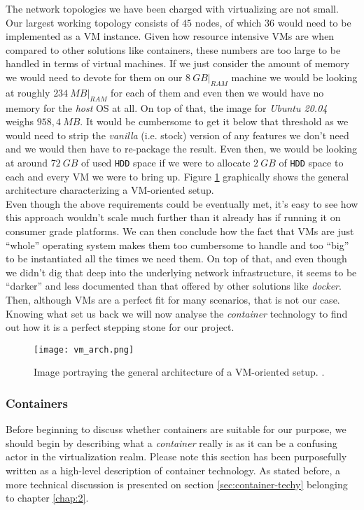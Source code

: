                 The network topologies we have been charged with virtualizing are not small. Our largest working topology consists of $45$ nodes, of which $36$ would need to be implemented as a VM instance. Given how resource intensive VMs are when compared to other solutions like containers, these numbers are too large to be handled in terms of virtual machines. If we just consider the amount of memory we would need to devote for them on our $8\ GB\rvert_{RAM}$ machine we would be looking at roughly $234\ MB\rvert_{RAM}$ for each of them and even then we would have no memory for the \textit{host} OS at all. On top of that, the image for \textit{Ubuntu 20.04} weighs $958,4\ MB$. It would be cumbersome to get it below that threshold as we would need to strip the \textit{vanilla} (i.e. stock) version of any features we don't need and we would then have to re-package the result. Even then, we would be looking at around $72\ GB$ of used \texttt{HDD} space if we were to allocate $2\ GB$ of \texttt{HDD} space to each and every VM we were to bring up. Figure \ref{fig:vm-arch} graphically shows the general architecture characterizing a VM-oriented setup.\\

                Even though the above requirements could be eventually met, it's easy to see how this approach wouldn't scale much further than it already has if running it on consumer grade platforms. We can then conclude how the fact that VMs are just ``whole'' operating system makes them too cumbersome to handle and too ``big'' to be instantiated all the times we need them. On top of that, and even though we didn't dig that deep into the underlying network infrastructure, it seems to be ``darker'' and less documented than that offered by other solutions like \textit{docker}. Then, although VMs are a perfect fit for many scenarios, that is not our case. Knowing what set us back we will now analyse the \textit{container} technology to find out how it is a perfect stepping stone for our project.

                \begin{figure}
                    \centering
                    \texttt{[image: vm\_arch.png]}
                    \caption[VM Setup]{Image portraying the general architecture of a VM-oriented setup. \cite{bib:vm-setup-img}.}
                    \label{fig:vm-arch}
                \end{figure}

            \subsubsection{Containers} \label{sec:container-intro}
                Before beginning to discuss whether containers are suitable for our purpose, we should begin by describing what a \textit{container} really is as it can be a confusing actor in the virtualization realm. Please note this section has been purposefully written as a high-level description of container technology. As stated before, a more technical discussion is presented on section \ref{sec:container-techy} belonging to chapter \ref{chap:2}.\\


